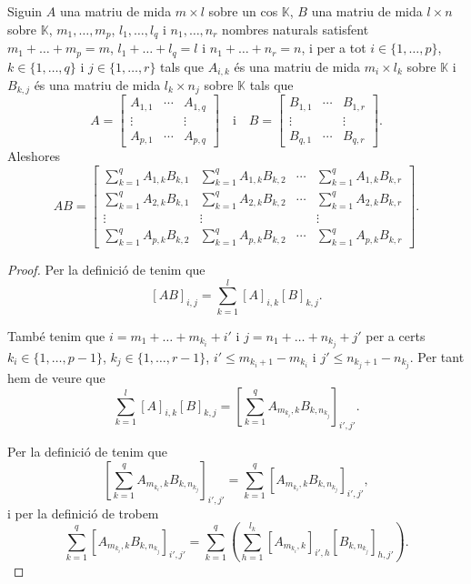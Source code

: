 \documentclass[../../Main.tex]{subfiles}
\begin{document}
	\begin{proposition}
		\label{prop:producte de matrius en blocs}
		Siguin \(A\) una matriu de mida \(m\times l\) sobre un cos \(\mathbb{K}\), \(B\) una matriu de mida \(l\times n\) sobre \(\mathbb{K}\), \(m_{1},\dots,m_{p}\), \(l_{1},\dots,l_{q}\) i \(n_{1},\dots,n_{r}\) nombres naturals satisfent \(m_{1}+\dots+m_{p}=m\), \(l_{1}+\dots+l_{q}=l\) i \(n_{1}+\dots+n_{r}=n\), i per a tot \(i\in\{1,\dots,p\}\), \(k\in\{1,\dots,q\}\) i \(j\in\{1,\dots,r\}\) tals que \(A_{i,k}\) és una matriu de mida \(m_{i}\times l_{k}\) sobre \(\mathbb{K}\) i \(B_{k,j}\) és una matriu de mida \(l_{k}\times n_{j}\) sobre \(\mathbb{K}\) tals que
		\[A=\left[\begin{matrix}
		A_{1,1} & \cdots & A_{1,q} \\
		\vdots & & \vdots \\
		A_{p,1} & \cdots & A_{p,q}
		\end{matrix}\right]\quad\text{i}\quad B=\left[\begin{matrix}
		B_{1,1} & \cdots & B_{1,r} \\
		\vdots & & \vdots \\
		B_{q,1} & \cdots & B_{q,r}
		\end{matrix}\right].\]
		Aleshores
		\[AB=\left[\begin{matrix}
		\sum_{k=1}^{q}A_{1,k}B_{k,1} & \sum_{k=1}^{q}A_{1,k}B_{k,2} & \cdots & \sum_{k=1}^{q}A_{1,k}B_{k,r} \\
		\sum_{k=1}^{q}A_{2,k}B_{k,1} & \sum_{k=1}^{q}A_{2,k}B_{k,2} & \cdots & \sum_{k=1}^{q}A_{2,k}B_{k,r} \\
		\vdots & \vdots & & \vdots \\
		\sum_{k=1}^{q}A_{p,k}B_{k,2} & \sum_{k=1}^{q}A_{p,k}B_{k,2} & \cdots & \sum_{k=1}^{q}A_{p,k}B_{k,r}
		\end{matrix}\right].\]
		\begin{proof}
			Per la definició de  tenim que
			\[
			    [AB]_{i,j}=\sum_{k=1}^{l}[A]_{i,k}[B]_{k,j}.
			\]
			
			També tenim que \(i=m_{1}+\dots+m_{k_{i}}+i'\) i \(j=n_{1}+\dots+n_{k_{j}}+j'\) per a certs \(k_{i}\in\{1,\dots,p-1\}\), \(k_{j}\in\{1,\dots,r-1\}\), \(i'\leq m_{k_{i}+1}-m_{k_{i}}\) i \(j'\leq n_{k_{j}+1}-n_{k_{j}}\). Per tant hem de veure que
			\[
			    \sum_{k=1}^{l}[A]_{i,k}[B]_{k,j}=\left[\sum_{k=1}^{q}A_{m_{k_{i}},k}B_{k,n_{k_{j}}}\right]_{i',j'}.
			\]
			
			Per la definició de  tenim que
			\[
			    \left[\sum_{k=1}^{q}A_{m_{k_{i}},k}B_{k,n_{k_{j}}}\right]_{i',j'}=\sum_{k=1}^{q}[A_{m_{k_{i}},k}B_{k,n_{k_{j}}}]_{i',j'},
			\]
			i per la definició de  trobem
			\[
			    \sum_{k=1}^{q}[A_{m_{k_{i}},k}B_{k,n_{k_{j}}}]_{i',j'}=\sum_{k=1}^{q}\left(\sum_{h=1}^{l_{k}}[A_{m_{k_{i}},k}]_{i',h}[B_{k,n_{k_{j}}}]_{h,j'}\right).
			\]
			

\end{proof}
\end{proposition}
\end{document}
